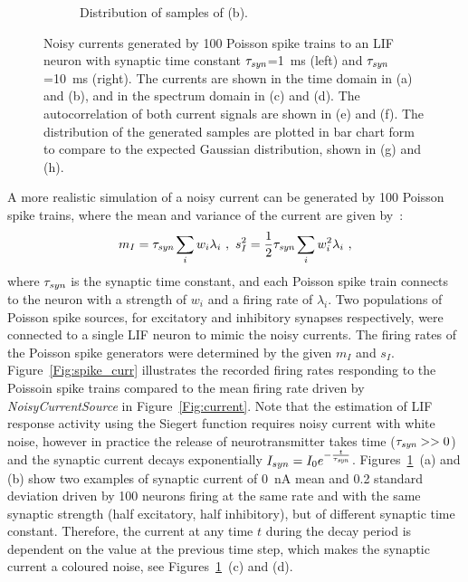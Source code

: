 \begin{figure}[tbp!]
\begin{subfigure}[t]{0.43\textwidth}
			\caption{Distribution of samples of (b).}
		\end{subfigure}
		\caption[Noisy currents generated by Poisson spike trains.]{Noisy currents generated by 100 Poisson spike trains to an LIF neuron with synaptic time constant $\tau_{\textit{\textrm{syn}}}$=1~ms (left) and $\tau_{\textit{\textrm{syn}}}$=10~ms (right). The currents are shown in the time domain in (a) and (b), and in the spectrum domain in (c) and (d). The autocorrelation of both current signals are shown in (e) and (f). The distribution of the generated samples are plotted in bar chart form to compare to the expected Gaussian distribution, shown in (g) and (h).}
		\label{Fig:lif_pois}
	\end{figure}

	A more realistic simulation of a noisy current can be generated by 100 Poisson spike trains, 
	where the mean and variance of the current are given by~\citep{la2008response}:
	\begin{equation}
	m_I = \tau_{\textit{\textrm{syn}}}\sum_i w_i\lambda_{i}~, ~s_I^2=\frac{1}{2}\tau_{\textit{\textrm{syn}}}\sum_i w_i^2\lambda_{i}~,
	\label{equ:distr0}
	\end{equation}
	where $\tau_{\textit{\textrm{syn}}}$ is the synaptic time constant, and each Poisson spike train connects to the neuron with a strength of $w_i$ and a firing rate of $\lambda_i$.
	Two populations of Poisson spike sources, for excitatory and inhibitory synapses respectively, were connected to a single LIF neuron to mimic the noisy currents.
	The firing rates of the Poisson spike generators were determined by the given $m_I$ and $s_I$.
	Figure~\ref{Fig:spike_curr} illustrates the recorded firing rates responding to the Poissoin spike trains compared to the mean firing rate driven by \textit{NoisyCurrentSource} in Figure~\ref{Fig:current}.
	Note that the estimation of LIF response activity using the Siegert function requires noisy current with white noise, however
	in practice the release of neurotransmitter takes time ($\tau_{\textit{\textrm{syn}}} >> 0$) and the synaptic current decays exponentially $I_{syn} = I_0 e^{-\frac{t}{\tau_{\textit{\textrm{syn}}}}}$.
	Figures~\ref{Fig:lif_pois}~(a) and (b) show two examples of synaptic current of 0~nA mean and 0.2 standard deviation driven by 100 neurons firing at the same rate and with the same synaptic strength (half excitatory, half inhibitory), but of different synaptic time constant.
	Therefore, the current at any time $t$ during the decay period is dependent on the value at the previous time step, which makes the synaptic current a coloured noise, see Figures~\ref{Fig:lif_pois}~(c) and (d).

